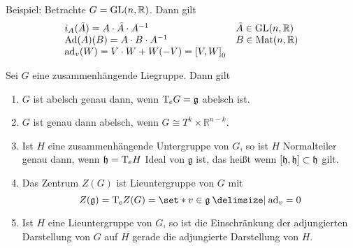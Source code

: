 Beispiel: Betrachte $G= \GL(n,\mathbb{R})$.
Dann gilt
\[
	\begin{array}{ll}
		i_A(\tilde{A}) = A \cdot \tilde{A} \cdot A^{-1} \quad & \tilde{A} \in \GL(n,\mathbb{R}) \\
		\Ad(A)(B) = A \cdot B \cdot A^{-1} & B \in \Mat(n,\mathbb{R}) \\
		\ad_v(W) = V \cdot W + W (-V) = \benbrace*{V,W}_0
	\end{array}
\]

\begin{lemma}[label=lem:154]
	Sei $G$ eine zusammenhängende Liegruppe. Dann gilt
	\begin{enumerate}[1)]
		\item $G$ ist abelsch genau dann, wenn $\Tmap_e G = \mathfrak{g}$ abelsch ist.
		\item $G$ ist genau dann abelsch, wenn $G \cong T^k \times \mathbb{R}^{n-k}$.
		\item Ist $H$ eine zusammenhängende Untergruppe von $G$, so ist $H$ Normalteiler genau dann, wenn $\mathfrak{h} = \Tmap_e H$ Ideal von $\mathfrak{g}$ ist, das heißt wenn $\benbrace*{\mathfrak{h},\mathfrak{h}} \subset \mathfrak{h}$ gilt.
		\item Das Zentrum $Z(G)$ ist Lieuntergruppe von $G$ mit 
		\[
			Z(\mathfrak{g}) = \Tmap_e Z(G) = \set*{v \in \mathfrak{g} \given \ad_v =0}
		\]
		\item Ist $H$ eine Lieuntergruppe von $G$, so ist die Einschränkung der adjungierten Darstellung von $G$ auf $H$ gerade die adjungierte Darstellung von $H$.
	\end{enumerate}
\end{lemma}

